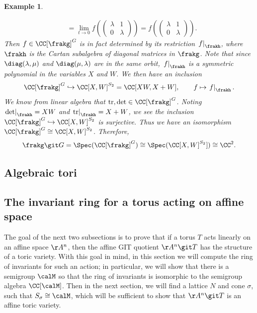 \documentclass[12pt]{amsart}
\theoremstyle{plain}
\newtheorem{example}[theorem]{Example}
\begin{document}
\begin{example}
\begin{enumerate}
\begin{align*}
&= \lim_{t \to 0} f\left( \begin{pmatrix} \lambda & 1 \\ 0 & \lambda \end{pmatrix} \right) 
= f\left( \begin{pmatrix} \lambda & 1 \\ 0 & \lambda \end{pmatrix} \right).
\end{align*}
Then $f \in \CC[\frakg]^G$ is in fact determined by its restriction $\left. f \right|_{\frakh}$, where $\frakh$ is the Cartan subalgebra of diagonal matrices in $\frakg$.
Note that since $\diag(\lambda, \mu)$ and $\diag(\mu, \lambda)$ are in the same orbit, $\left. f \right|_\frakh$ is a symmetric polynomial in the variables $X$ and $W$.
We then have an inclusion
$$\CC[\frakg]^G \hookrightarrow \CC[X, W]^{S_2} = \CC[XW, X+W], \qquad f \mapsto \left. f \right|_\frakh.$$
We know from linear algebra that $\mathrm{tr}, \mathrm{det} \in \CC[\frakg]^G$.
Noting $\left. \mathrm{det} \right|_\frakh = XW$ and $\left. \mathrm{tr} \right|_\frakh = X+W$, we see the inclusion $\CC[\frakg]^G \hookrightarrow \CC[X, W]^{S_2}$ is surjective.
Thus we have an isomorphism $\CC[\frakg]^G \cong \CC[X, W]^{S_2}$.
Therefore,
$$\frakg \git G = \Spec(\CC[\frakg]^G) \cong \Spec(\CC[X, W]^{S_2}]) \cong \CC^2.$$
\end{enumerate}
\end{example}





\subsection{Algebraic tori}





\subsection{The invariant ring for a torus acting on affine space}
The goal of the next two subsections is to prove that if a torus $T$ acts linearly on an affine space $\AA^n$, then the affine GIT quotient $\AA^n \git T$ has the structure of a toric variety.
With this goal in mind, in this section we will compute the ring of invariants for such an action;
in particular, we will show that there is a semigroup $\calM$ so that the ring of invariants is isomorphic to the semigroup algebra $\CC[\calM]$.
Then in the next section, we will find a lattice $N$ and cone $\sigma$, such that $S_\sigma \cong \calM$, which will be sufficient to show that $\AA^n \git T$ is an affine toric variety.
\end{document}
